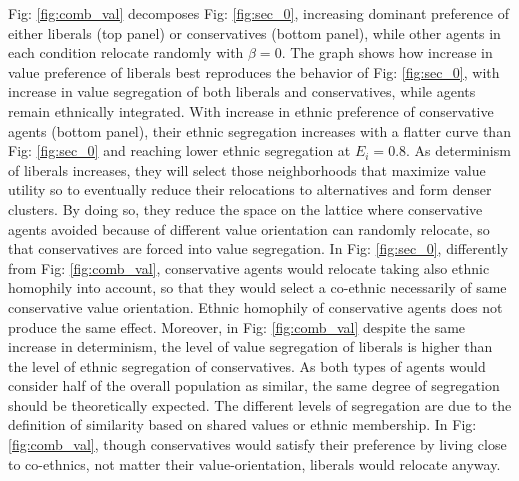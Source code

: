 \documentclass{article}
\begin{document}
Fig: \ref{fig:comb_val} decomposes Fig: \ref{fig:sec_0}, increasing dominant preference of either liberals (top panel) or conservatives (bottom panel), while other agents in each condition relocate randomly with $\beta = 0$. The graph shows how increase in value preference of liberals best reproduces the behavior of Fig: \ref{fig:sec_0}, with increase in value segregation of both liberals and conservatives, while agents remain ethnically integrated. %
With increase in ethnic preference of conservative agents (bottom panel), their ethnic segregation increases with a flatter curve than Fig: \ref{fig:sec_0} and reaching lower ethnic segregation at $E_i = 0.8$. %
As determinism of liberals increases, they will select those neighborhoods that maximize value utility so to eventually reduce their relocations to alternatives and form denser clusters. By doing so, they reduce the space on the lattice where conservative agents avoided because of different value orientation can randomly relocate, so that conservatives are forced into value segregation. In Fig: \ref{fig:sec_0}, differently from Fig: \ref{fig:comb_val}, conservative agents would relocate taking also ethnic homophily into account, so that they would select a co-ethnic necessarily of same conservative value orientation. Ethnic homophily of conservative agents does not produce the same effect. Moreover, in Fig: \ref{fig:comb_val} despite the same increase in determinism, the level of value segregation of liberals is higher than the level of ethnic segregation of conservatives. As both types of agents would consider half of the overall population as similar, %
the same degree of segregation should be theoretically expected. The different levels of segregation are due to the definition of similarity based on shared values or ethnic membership. In Fig: \ref{fig:comb_val}, though conservatives would satisfy their preference by living close to co-ethnics, not matter their value-orientation, liberals would relocate anyway. 
\end{document}
